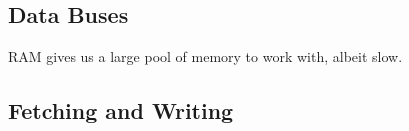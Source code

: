 \subsection{Data Buses} 

  RAM gives us a large pool of memory to work with, albeit slow. 

\subsection{Fetching and Writing} 

